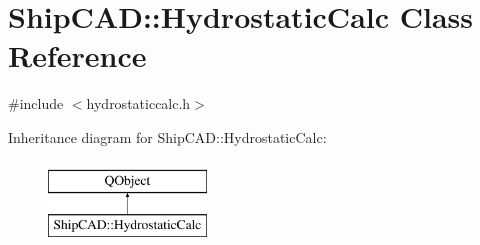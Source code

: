\hypertarget{classShipCAD_1_1HydrostaticCalc}{\section{Ship\-C\-A\-D\-:\-:Hydrostatic\-Calc Class Reference}
\label{classShipCAD_1_1HydrostaticCalc}
}


{\ttfamily \#include $<$hydrostaticcalc.\-h$>$}

Inheritance diagram for Ship\-C\-A\-D\-:\-:Hydrostatic\-Calc\-:\begin{figure}[H]
\begin{center}
\leavevmode
\includegraphics[height=2.000000cm]{classShipCAD_1_1HydrostaticCalc}
\end{center}
\end{figure}
